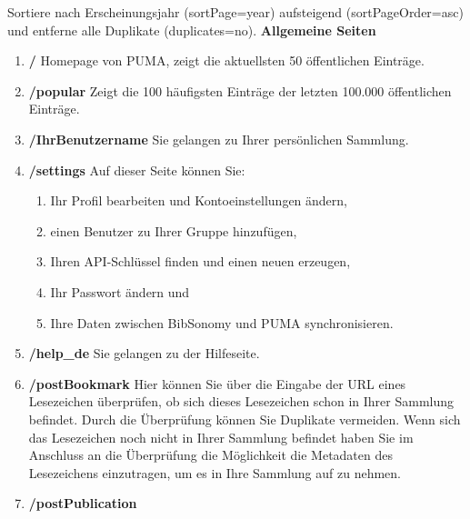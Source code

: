 Sortiere nach Erscheinungsjahr (sortPage=year) aufsteigend (sortPageOrder=asc) und entferne alle Duplikate (duplicates=no). \newline
\newline
\textbf{Allgemeine Seiten}
\begin{enumerate}
    \item \textbf{/} \newline
    Homepage von PUMA, zeigt die aktuellsten 50 öffentlichen Einträge.
    \item \textbf{/popular} \newline
    Zeigt die 100 häufigsten Einträge der letzten 100.000 öffentlichen Einträge.
    \item \textbf{/IhrBenutzername} \newline
    Sie gelangen zu Ihrer persönlichen Sammlung.
    \item \textbf{/settings} \newline
    Auf dieser Seite können Sie:
    \begin{enumerate}
        \item Ihr Profil bearbeiten und Kontoeinstellungen ändern,
        \item einen Benutzer zu Ihrer Gruppe hinzufügen,
        \item Ihren API-Schlüssel finden und einen neuen erzeugen,
        \item Ihr Passwort ändern und
        \item Ihre Daten zwischen BibSonomy und PUMA synchronisieren.
    \end{enumerate}
    \item \textbf{/help\_de} \newline
    Sie gelangen zu der Hilfeseite.
    \item \textbf{/postBookmark} \newline
    Hier können Sie über die Eingabe der URL eines Lesezeichen überprüfen, ob sich dieses Lesezeichen schon in Ihrer Sammlung befindet. Durch die Überprüfung können Sie Duplikate vermeiden. Wenn sich das Lesezeichen noch nicht in Ihrer Sammlung befindet haben Sie im Anschluss an die Überprüfung die Möglichkeit die Metadaten des Lesezeichens einzutragen, um es in Ihre Sammlung auf zu nehmen.
    \item \textbf{/postPublication} \newline

\end{enumerate}
